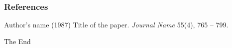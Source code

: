 \documentclass{beamer}
\begin{document}
\begin{frame}
\frametitle{References}
\footnotesize{
\begin{thebibliography}{99}
  Author's name (1987)
 \newblock Title of the paper.
 \newblock \emph{Journal Name} 55(4), 765 -- 799.
\end{thebibliography}
}
\end{frame}
 
\begin{frame}
\centerline{The End}
\end{frame}
\end{document}
